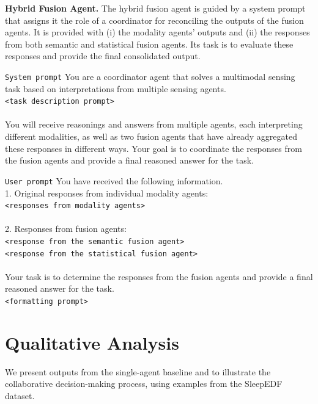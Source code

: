 \noindent \textbf{Hybrid Fusion Agent.} The hybrid fusion agent is guided by a system prompt that assigns it the role of a coordinator for reconciling the outputs of the fusion agents. It is provided with (i) the modality agents' outputs and (ii) the responses from both semantic and statistical fusion agents. Its task is to evaluate these responses and provide the final consolidated output.

\begin{promptbox}{\texttt{System prompt}}
You are a coordinator agent that solves a multimodal sensing task based on interpretations from multiple sensing agents. \\
\texttt{<task description prompt>} \\ \\
You will receive reasonings and answers from multiple agents, each interpreting different modalities, as well as two fusion agents that have already aggregated these responses in different ways.
Your goal is to coordinate the responses from the fusion agents and provide a final reasoned answer for the task.
\end{promptbox}

\begin{promptbox}{\texttt{User prompt}}
You have received the following information. \\
1. Original responses from individual modality agents: \\
\texttt{<responses from modality agents>} \\ \\
2. Responses from fusion agents: \\
\texttt{<response from the semantic fusion agent>} \\
\texttt{<response from the statistical fusion agent>} \\ \\
Your task is to determine the responses from the fusion agents and provide a final reasoned answer for the task. \\
\texttt{<formatting prompt>}
\end{promptbox}

\section{Qualitative Analysis}
\label{sec:appendix_outputs}

We present outputs from the single-agent baseline and \system{} to illustrate the collaborative decision-making process, using examples from the SleepEDF dataset.

